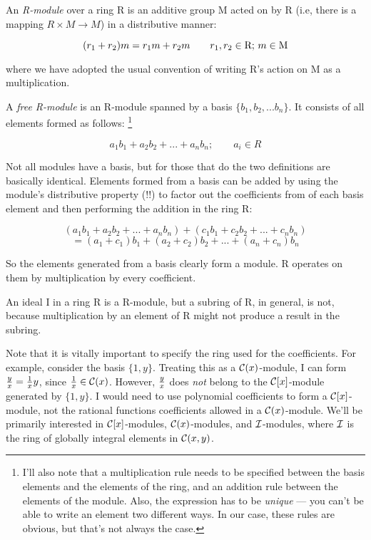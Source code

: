 
An {\it R-module} over a ring R is an additive group M acted on by R
(i.e, there is a mapping $R \times M \to M$) in a distributive manner:

$$(r_1 + r_2)m = r_1 m + r_2 m \qquad r_1, r_2 \in {\rm R};\, m \in {\rm M}$$

where we have adopted the usual convention of writing R's action on M
as a multiplication.

\enddefinition


A {\it free R-module} is an R-module spanned by a basis
$\{b_1, b_2, ... b_n\}$.  It consists of all elements formed as follows:
\footnote{I'll also note that a multiplication rule needs to be specified
between the basis elements and the elements of the ring, and an
addition rule between the elements of the module.  Also,
the expression has to be {\it unique} --- you can't be
able to write an element two different ways.  In our
case, these rules are obvious, but that's not always the case.}

	$$ a_1 b_1 + a_2 b_2 + ... + a_n b_n; \qquad a_i \in R $$


\enddefinition

Not all modules have a basis, but for those that do the two
definitions are basically identical.  Elements formed from a basis can
be added by using the module's distributive property (!!) to factor out the
coefficients from of each basis element and then performing the addition
in the ring R:

$$ (a_1 b_1 + a_2 b_2 + ... + a_n b_n) + (c_1 b_1 + c_2 b_2 + ... + c_n b_n) $$
$$  = (a_1 + c_1) b_1 + (a_2 + c_2) b_2 + ... + (a_n + c_n) b_n $$

So the elements generated from a basis clearly form a module.  R operates
on them by multiplication by every coefficient.

\example

An ideal I in a ring R is a R-module, but a subring of R, in
general, is not, because multiplication by an element of R might
not produce a result in the subring.

\endexample


Note that it is vitally important to specify the ring used for the
coefficients.  For example, consider the basis $\{1, y\}$.  Treating
this as a ${\cal C}(x)$-module, I can form ${y \over x} = {1 \over x}
y$, since ${1 \over x} \in {\cal C}(x)$.  However, $y \over x$ does {\it
not} belong to the ${\cal C}[x]$-module generated by $\{1, y\}$.  I
would need to use polynomial coefficients to form a ${\cal
C}[x]$-module, not the rational functions coefficients allowed in a
${\cal C}(x)$-module.  We'll be primarily interested in ${\cal C}[x]$-modules,
${\cal C}(x)$-modules, and ${\cal I}$-modules, where ${\cal I}$ is the ring
of globally integral elements in ${\cal C}(x,y)$.


